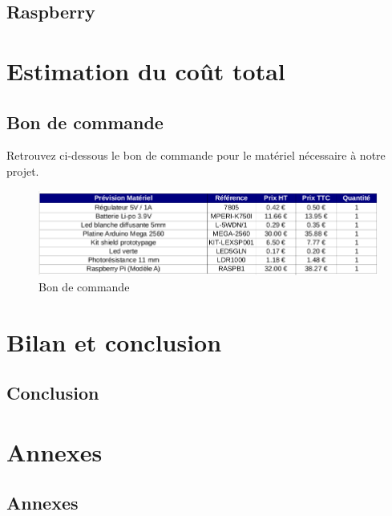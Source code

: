 \documentclass[12pt,titlepage,a4paper]{report}
\begin{document}
		\chapter{Raspberry}
		


	\part{Estimation du coût total}
		\chapter{Bon de commande}
		Retrouvez ci-dessous le bon de commande pour le matériel nécessaire à notre 	projet.
		\begin{figure}[H]
			\centering
			\includegraphics[width=550px]{images/lextronic.png}
			\caption{Bon de commande}
		\end{figure}


	\part{Bilan et conclusion}
		\chapter{Conclusion}
		


	\part{Annexes}
		\chapter{Annexes}
		
\end{document}
